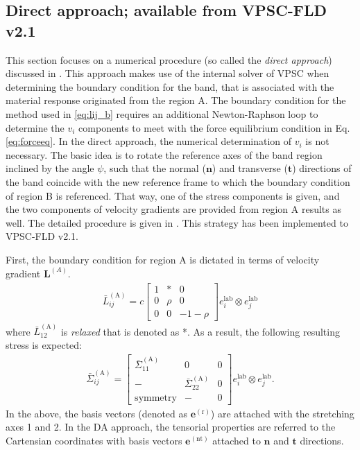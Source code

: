 \documentclass[12pt]{amsart}
\begin{document}
\newpage
\subsection{Direct approach; available from VPSC-FLD v2.1}
\label{sec:imple_da}
This section focuses on a numerical procedure (so called the \emph{direct approach}) discussed in \cite{schwindt201562}.
This approach makes use of the internal solver of VPSC when determining the boundary condition for the band, that is associated with the material response originated from the region A.
The boundary condition for the method used in \ref{eq:lij_b} requires an additional Newton-Raphson loop to determine the $v_i$ components to meet with the force equilibrium condition in Eq. \ref{eq:forceeq}.
In the direct approach, the numerical determination of $v_i$ is not necessary.
The basic idea is to rotate the reference axes of the band region inclined by the angle $\psi$, such that the normal ($\mathbf{n}$) and transverse ($\mathbf{t}$) directions of the band coincide with the new reference frame to which the boundary condition of region B is referenced.
That way, one of the stress components is given, and the two components of velocity gradients are provided from region A results as well.
The detailed procedure is given in \cite{schwindt201562}.
This strategy has been implemented to VPSC-FLD v2.1.

First, the boundary condition for region A is dictated in terms of velocity gradient $\mathbf{L}^{(A)}$.
\begin{eqnarray}
  \label{eq:lij0_da}
  \bar{L}^{\mathrm{(A)}}_{ij}= c
  \begin{bmatrix}
    1 & *    & 0 \\
    0 & \rho & 0 \\
    0 & 0    & -1 -\rho
  \end{bmatrix}
  e^\mathrm{lab}_i \otimes e^\mathrm{lab}_j
\end{eqnarray}
where $\bar{L}^{\mathrm{(A)}}_{12}$ is {\it relaxed} that is denoted as *.
As a result, the following resulting stress is expected:
\begin{eqnarray}
  \label{eq:sigma_da}
  \bar{\Sigma}^{\mathrm{(A)}}_{ij}=
  \begin{bmatrix}
    \bar{\Sigma}^{\mathrm{(A)}}_{11} & 0                                & 0  \\
    -                                & \bar{\Sigma}^{\mathrm{(A)}}_{22} & 0  \\
    \text{symmetry}                  & -                                & 0
  \end{bmatrix}
  e^\mathrm{lab}_i \otimes e^\mathrm{lab}_j.
\end{eqnarray}
In the above, the basis vectors (denoted as $\mathbf{e}^\mathrm{(r)}$) are attached with the stretching axes 1 and 2.
In the DA approach, the tensorial properties are referred to the Cartensian coordinates with basis vectors $\mathbf{e}^\mathrm{(nt)}$ attached to $\mathbf{n}$ and $\mathbf{t}$ directions.
\end{document}
